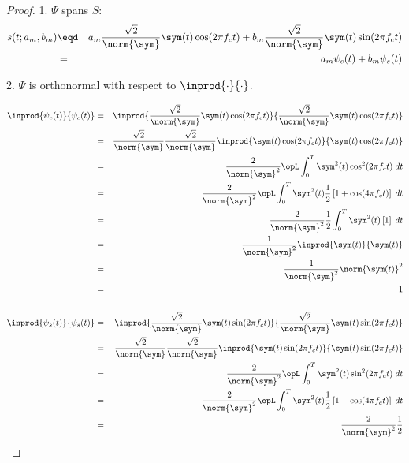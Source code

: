 \begin{proof}

1. $\Psi$ spans $S$:
\begin{eqnarray*}
   s(t;a_m,b_m) 
     &\eqd& a_m\frac{\sqrt{2}}{\norm{\sym}} \sym(t) \cos(2\pi f_c t) + 
            b_m\frac{\sqrt{2}}{\norm{\sym}} \sym(t) \sin(2\pi f_c t)
   \\&=&    a_m\psi_c(t) + b_m\psi_s(t)
\end{eqnarray*}

2. $\Psi$ is orthonormal with respect to $\inprod{\cdot}{\cdot}$.

\begin{eqnarray*}
   \inprod{\psi_c(t)}{\psi_c(t)}
      &=& \inprod{\frac{\sqrt{2}}{\norm{\sym}} \sym(t) \cos(2\pi f_c t)}
                 {\frac{\sqrt{2}}{\norm{\sym}} \sym(t) \cos(2\pi f_c t)}
    \\&=& \frac{\sqrt{2}}{\norm{\sym}}\frac{\sqrt{2}}{\norm{\sym}}
          \inprod{ \sym(t) \cos(2\pi f_c t)}
                 { \sym(t) \cos(2\pi f_c t)}
    \\&=& \frac{2}{\norm{\sym}^2}
          \opL
          \int_0^T \sym^2(t) \cos^2(2\pi f_c t) \; dt
    \\&=& \frac{2}{\norm{\sym}^2}
          \opL
          \int_0^T \sym^2(t)\frac{1}{2}\left[1+ \cos(4\pi f_c t)\right] \; dt
    \\&=& \frac{2}{\norm{\sym}^2}\frac{1}{2}
          \int_0^T \sym^2(t)\left[ 1 \right] \; dt
    \\&=& \frac{1}{\norm{\sym}^2}
          \inprod{\sym(t)}{\sym(t)}
    \\&=& \frac{1}{\norm{\sym}^2}
          \norm{\sym(t)}^2
    \\&=& 1
\\ \\
   \inprod{\psi_s(t)}{\psi_s(t)}
      &=& \inprod{\frac{\sqrt{2}}{\norm{\sym}} \sym(t) \sin(2\pi f_c t)}
                 {\frac{\sqrt{2}}{\norm{\sym}} \sym(t) \sin(2\pi f_c t)}
    \\&=& \frac{\sqrt{2}}{\norm{\sym}}\frac{\sqrt{2}}{\norm{\sym}}
          \inprod{ \sym(t) \sin(2\pi f_c t)}
                 { \sym(t) \sin(2\pi f_c t)}
    \\&=& \frac{2}{\norm{\sym}^2}
          \opL
          \int_0^T \sym^2(t) \sin^2(2\pi f_c t) \; dt
    \\&=& \frac{2}{\norm{\sym}^2}
          \opL
          \int_0^T \sym^2(t)\frac{1}{2}\left[1- \cos(4\pi f_c t)\right] \; dt
    \\&=& \frac{2}{\norm{\sym}^2}\frac{1}{2}

\end{eqnarray*}
\end{proof}
